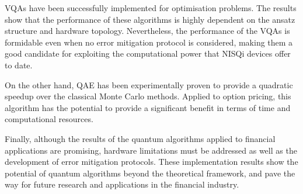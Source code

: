 \documentclass[prx,twocolumn,floatfix,superscriptaddress,longbibliography]{revtex4-1}
\begin{document}
VQAs have been successfully implemented for optimisation problems. The results show that the performance of these algorithms is highly dependent on the ansatz structure and hardware topology. Nevertheless, the performance of the VQAs is formidable even when no error mitigation protocol is considered, making them a good candidate for exploiting the computational power that NISQi devices offer to date.  

On the other hand, QAE has been experimentally proven to provide a quadratic speedup over the classical Monte Carlo methods. Applied to 
option pricing, this algorithm has the potential to provide a significant benefit in terms of time and computational 
resources.

Finally, although the results of the quantum algorithms applied to financial applications are promising, 
hardware limitations must be addressed as well as the development of error mitigation protocols. These  implementation results 
show the potential of quantum algorithms beyond the theoretical framework, and pave the way for future research and 
applications in the financial industry.

\FloatBarrier


\end{document}
